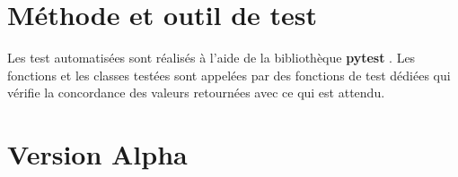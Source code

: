 \section{Méthode et outil de test}

Les test automatisées sont réalisés à l'aide de la bibliothèque \textbf{pytest} . Les fonctions et les classes testées sont
appelées par des fonctions de test dédiées qui vérifie la concordance des valeurs retournées avec ce qui est attendu.



\section{Version Alpha}


\noindent%
\begin{adjustwidth}{-1.5cm}{0cm}


\end{adjustwidth}
